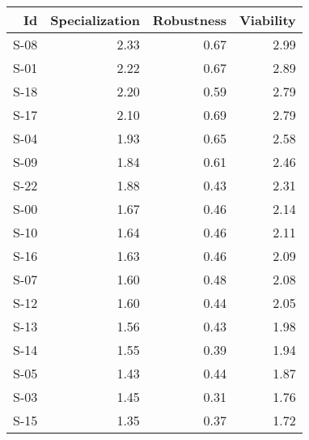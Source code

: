 

\begin{tabular}{ | r | r | r | r | }
    \hline
                    Id  &  Specialization  &      Robustness  &       Viability  \\
    \hline
    \hline
                  S-08  &            2.33  &            0.67  &            2.99  \\
    \hline
                  S-01  &            2.22  &            0.67  &            2.89  \\
    \hline
                  S-18  &            2.20  &            0.59  &            2.79  \\
    \hline
                  S-17  &            2.10  &            0.69  &            2.79  \\
    \hline
                  S-04  &            1.93  &            0.65  &            2.58  \\
    \hline
                  S-09  &            1.84  &            0.61  &            2.46  \\
    \hline
                  S-22  &            1.88  &            0.43  &            2.31  \\
    \hline
                  S-00  &            1.67  &            0.46  &            2.14  \\
    \hline
                  S-10  &            1.64  &            0.46  &            2.11  \\
    \hline
                  S-16  &            1.63  &            0.46  &            2.09  \\
    \hline
                  S-07  &            1.60  &            0.48  &            2.08  \\
    \hline
                  S-12  &            1.60  &            0.44  &            2.05  \\
    \hline
                  S-13  &            1.56  &            0.43  &            1.98  \\
    \hline
                  S-14  &            1.55  &            0.39  &            1.94  \\
    \hline
                  S-05  &            1.43  &            0.44  &            1.87  \\
    \hline
                  S-03  &            1.45  &            0.31  &            1.76  \\
    \hline
                  S-15  &            1.35  &            0.37  &            1.72  \\

\end{tabular}
